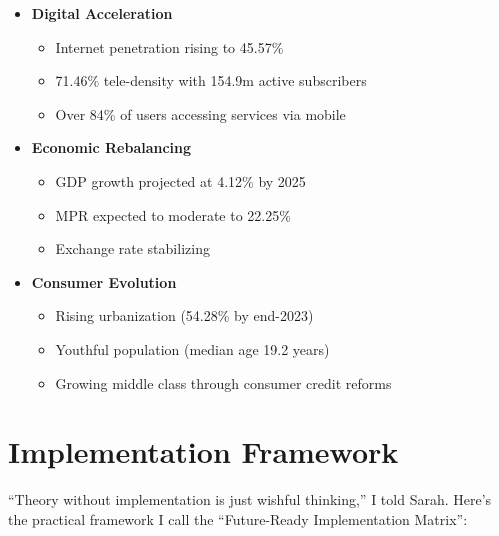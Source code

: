 \begin{tcolorbox}[colback=white,colframe=primarydark,title=\textbf{The Triple Wave of Change}]
\begin{itemize}
    \item \textbf{Digital Acceleration}
    \begin{itemize}
        \item Internet penetration rising to 45.57\% 
        \item 71.46\% tele-density with 154.9m active subscribers
        \item Over 84\% of users accessing services via mobile
    \end{itemize}
    
    \item \textbf{Economic Rebalancing}
    \begin{itemize}
        \item GDP growth projected at 4.12\% by 2025
        \item MPR expected to moderate to 22.25\%
        \item Exchange rate stabilizing
    \end{itemize}
    
    \item \textbf{Consumer Evolution}
    \begin{itemize}
        \item Rising urbanization (54.28\% by end-2023)
        \item Youthful population (median age 19.2 years)
        \item Growing middle class through consumer credit reforms
    \end{itemize}
\end{itemize}
\end{tcolorbox}

\section{Implementation Framework}\label{sec:implementation-framework}

``Theory without implementation is just wishful thinking,'' I told Sarah. Here's the practical framework I call the ``Future-Ready Implementation Matrix'':

